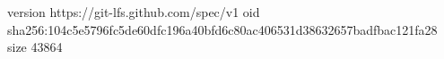 version https://git-lfs.github.com/spec/v1
oid sha256:104c5e5796fc5de60dfc196a40bfd6c80ac406531d38632657badfbac121fa28
size 43864
